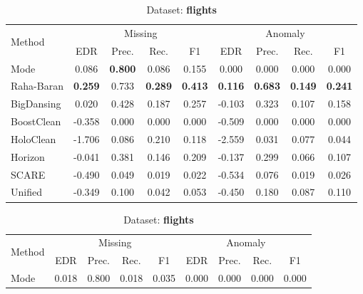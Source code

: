 \documentclass[10pt]{article} %
\numberwithin{equation}{section}
\begin{document}
\begin{table}[htbp]
\centering
\scriptsize                     %
\setlength{\tabcolsep}{3pt}
\renewcommand{\arraystretch}{1.05}

\begin{subtable}[t]{0.492\linewidth}
\caption{Dataset: \textbf{beers}}
\label{tab:q1-acc-beers}
\centering
\begin{tabular}{lcccccccc}
\toprule
\multirow{2}{*}{Method} &
\multicolumn{4}{c}{Missing} &
\multicolumn{4}{c}{Anomaly}\\
\cmidrule(lr){2-5}\cmidrule(l){6-9}
 & EDR & Prec. & Rec. & F1
 & EDR & Prec. & Rec. & F1\\
\midrule
Mode        & 0.086 & \textbf{0.800} & 0.086 & 0.155 & 0.000 & 0.000 & 0.000 & 0.000 \\
Raha-Baran  & \textbf{0.259} & 0.733 & \textbf{0.289} & \textbf{0.413} & \textbf{0.116} & \textbf{0.683} & \textbf{0.149} & \textbf{0.241} \\
BigDansing  & 0.020 & 0.428 & 0.187 & 0.257 & -0.103 & 0.323 & 0.107 & 0.158 \\
BoostClean  & -0.358 & 0.000 & 0.000 & 0.000 & -0.509 & 0.000 & 0.000 & 0.000 \\
HoloClean   & -1.706 & 0.086 & 0.210 & 0.118 & -2.559 & 0.031 & 0.077 & 0.044 \\
Horizon     & -0.041 & 0.381 & 0.146 & 0.209 & -0.137 & 0.299 & 0.066 & 0.107 \\
SCARE       & -0.490 & 0.049 & 0.019 & 0.022 & -0.534 & 0.076 & 0.019 & 0.026 \\
Unified     & -0.349 & 0.100 & 0.042 & 0.053 & -0.450 & 0.180 & 0.087 & 0.110 \\
\bottomrule
\end{tabular}
\end{subtable}\hspace{0.01\linewidth}%
%
\begin{subtable}[t]{0.492\linewidth}
\caption{Dataset: \textbf{flights}}
\label{tab:q1-acc-flights}
\centering
\begin{tabular}{lcccccccc}
\toprule
\multirow{2}{*}{Method} &
\multicolumn{4}{c}{Missing} &
\multicolumn{4}{c}{Anomaly}\\
\cmidrule(lr){2-5}\cmidrule(l){6-9}
 & EDR & Prec. & Rec. & F1
 & EDR & Prec. & Rec. & F1\\
\midrule
Mode        & 0.018 & 0.800 & 0.018 & 0.035 & 0.000 & 0.000 & 0.000 & 0.000 \\

\end{tabular}
\end{subtable}
\end{table}
\end{document}
